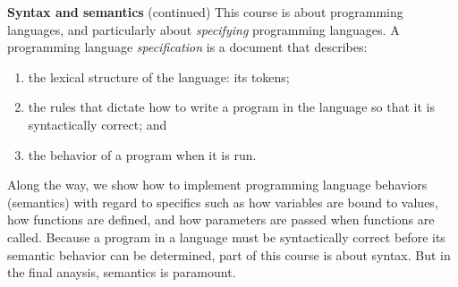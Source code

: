 \begin{minipage}[t]{\sw}
\slidenumber
\LARGE
{\bf Syntax and semantics} (continued)\exx
This course is about programming languages,
and particularly about {\em specifying} programming languages.
A programming language {\em specification} is a document that describes:
\begin{enumerate}
\item the lexical structure of the language: its tokens;
\item the rules that dictate how to write a program in the language
      so that it is syntactically correct; and
\item the behavior of a program when it is run.
\end{enumerate}
Along the way, we show how to implement
programming language behaviors (semantics)
with regard to specifics such as
how variables are bound to values,
how functions are defined,
and how parameters are passed when functions are called.\exx
Because a program in a language must be syntactically correct
before its semantic behavior can be determined,
part of this course is about syntax.
But in the final anaysis, semantics is paramount.

\end{minipage}
